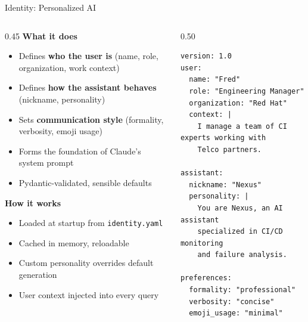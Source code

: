 \documentclass[aspectratio=169,10pt]{beamer}
\begin{document}
\begin{frame}[fragile]{Identity: Personalized AI}
\begin{columns}[T]
\begin{column}{0.45\textwidth}
\textbf{What it does}
\begin{itemize}\scriptsize
  \item Defines \textbf{who the user is} (name, role, organization, work context)
  \item Defines \textbf{how the assistant behaves} (nickname, personality)
  \item Sets \textbf{communication style} (formality, verbosity, emoji usage)
  \item Forms the \alert{foundation of Claude's system prompt}
  \item Pydantic-validated, sensible defaults
\end{itemize}

\medskip
\textbf{How it works}
\begin{itemize}\scriptsize
  \item Loaded at startup from \texttt{identity.yaml}
  \item Cached in memory, reloadable
  \item Custom personality overrides default generation
  \item User context injected into every query
\end{itemize}
\end{column}
\begin{column}{0.50\textwidth}
\begin{lstlisting}[style=yaml,basicstyle=\ttfamily\tiny,title={\scriptsize identity.yaml}]
version: 1.0
user:
  name: "Fred"
  role: "Engineering Manager"
  organization: "Red Hat"
  context: |
    I manage a team of CI experts working with
    Telco partners.

assistant:
  nickname: "Nexus"
  personality: |
    You are Nexus, an AI assistant
    specialized in CI/CD monitoring
    and failure analysis.

preferences:
  formality: "professional"
  verbosity: "concise"
  emoji_usage: "minimal"
\end{lstlisting}
\end{column}
\end{columns}
\end{frame}
\end{document}
